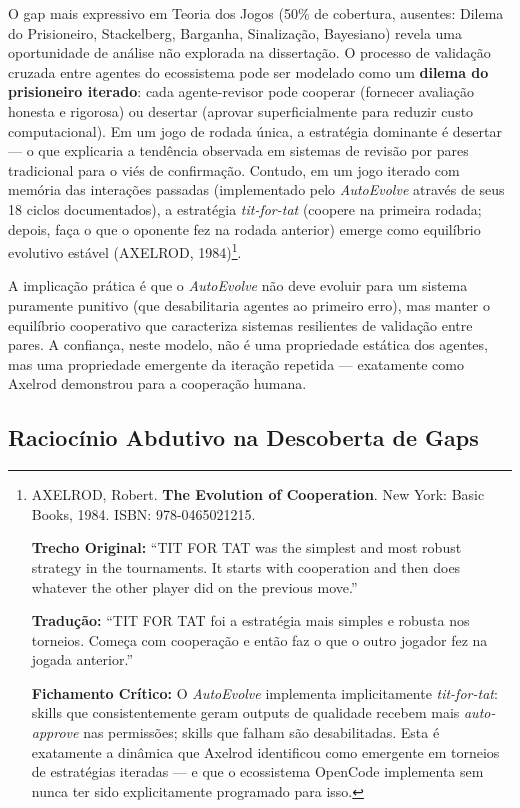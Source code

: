 O gap mais expressivo em Teoria dos Jogos (50\% de cobertura, ausentes: Dilema do Prisioneiro, Stackelberg, Barganha, Sinalização, Bayesiano) revela uma oportunidade de análise não explorada na dissertação. O processo de validação cruzada entre agentes do ecossistema pode ser modelado como um \textbf{dilema do prisioneiro iterado}: cada agente-revisor pode cooperar (fornecer avaliação honesta e rigorosa) ou desertar (aprovar superficialmente para reduzir custo computacional). Em um jogo de rodada única, a estratégia dominante é desertar --- o que explicaria a tendência observada em sistemas de revisão por pares tradicional para o viés de confirmação. Contudo, em um jogo iterado com memória das interações passadas (implementado pelo \textit{AutoEvolve} através de seus 18 ciclos documentados), a estratégia \textit{tit-for-tat} (coopere na primeira rodada; depois, faça o que o oponente fez na rodada anterior) emerge como equilíbrio evolutivo estável (AXELROD, 1984)\footnote{
  AXELROD, Robert. \textbf{The Evolution of Cooperation}. New York: Basic Books, 1984. ISBN: 978-0465021215.

  \textbf{Trecho Original:} ``TIT FOR TAT was the simplest and most robust strategy in the tournaments. It starts with cooperation and then does whatever the other player did on the previous move.''

  \textbf{Tradução:} ``TIT FOR TAT foi a estratégia mais simples e robusta nos torneios. Começa com cooperação e então faz o que o outro jogador fez na jogada anterior.''

  \textbf{Fichamento Crítico:} O \textit{AutoEvolve} implementa implicitamente \textit{tit-for-tat}: skills que consistentemente geram outputs de qualidade recebem mais \textit{auto-approve} nas permissões; skills que falham são desabilitadas. Esta é exatamente a dinâmica que Axelrod identificou como emergente em torneios de estratégias iteradas --- e que o ecossistema OpenCode implementa sem nunca ter sido explicitamente programado para isso.
}.

A implicação prática é que o \textit{AutoEvolve} não deve evoluir para um sistema puramente punitivo (que desabilitaria agentes ao primeiro erro), mas manter o equilíbrio cooperativo que caracteriza sistemas resilientes de validação entre pares. A confiança, neste modelo, não é uma propriedade estática dos agentes, mas uma propriedade emergente da iteração repetida --- exatamente como Axelrod demonstrou para a cooperação humana.

\subsection{Raciocínio Abdutivo na Descoberta de Gaps}

